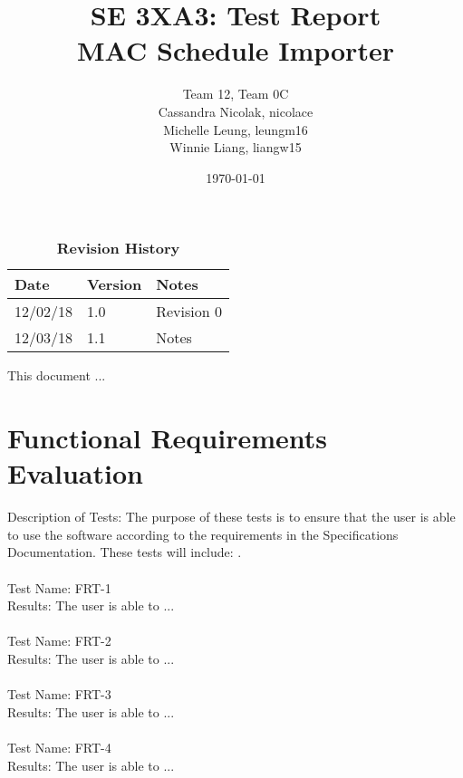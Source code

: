 \documentclass[12pt, titlepage]{article}
\title{SE 3XA3: Test Report\\MAC Schedule Importer}
\author{Team 12, Team 0C
		\\ Cassandra Nicolak, nicolace
		\\ Michelle Leung, leungm16
		\\ Winnie Liang, liangw15
}
\date{\today}
\begin{document}
\maketitle

\tableofcontents
\listoftables
\listoffigures

\begin{table}[bp]
\caption{\bf Revision History}
\begin{tabularx}{\textwidth}{p{3cm}p{2cm}X}
\toprule {\bf Date} & {\bf Version} & {\bf Notes}\\
\midrule
12/02/18 & 1.0 & Revision 0\\
12/03/18 & 1.1 & Notes\\
\bottomrule
\end{tabularx}
\end{table}

\newpage


This document ...

\section{Functional Requirements Evaluation}
	Description of Tests: The purpose of these tests is to ensure that the user is able to use the software according to the requirements in the Specifications Documentation. These tests will include: . \\ \\
	
	Test Name: FRT-1 \\
	
	Results: The user is able to ... \\ \\
	
	Test Name: FRT-2 \\
	
	Results: The user is able to ... \\ \\
	
	Test Name: FRT-3 \\
	
	Results: The user is able to ... \\ \\
	
	Test Name: FRT-4 \\
	
	Results: The user is able to ... \\ \\
\end{document}
